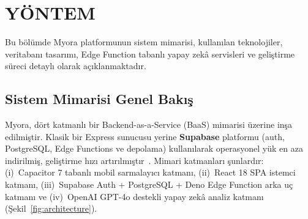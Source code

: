 \section{YÖNTEM}
\label{sec:yontem}

Bu bölümde Myora platformunun sistem mimarisi, kullanılan teknolojiler, veritabanı tasarımı, Edge Function tabanlı yapay zekâ servisleri ve geliştirme süreci detaylı olarak açıklanmaktadır.

\subsection{Sistem Mimarisi Genel Bakış}

Myora, dört katmanlı bir Backend-as-a-Service (BaaS) mimarisi üzerine inşa edilmiştir. Klasik bir Express sunucusu yerine \textbf{Supabase} platformu (auth, PostgreSQL, Edge Functions ve depolama) kullanılarak operasyonel yük en aza indirilmiş, geliştirme hızı artırılmıştır~\cite{Supabase2024}. Mimari katmanları şunlardır: (i)~Capacitor 7 tabanlı mobil sarmalayıcı katmanı, (ii)~React 18 SPA istemci katmanı, (iii)~Supabase Auth + PostgreSQL + Deno Edge Function arka uç katmanı ve (iv)~OpenAI GPT-4o destekli yapay zekâ analiz katmanı (Şekil~\ref{fig:architecture}).

